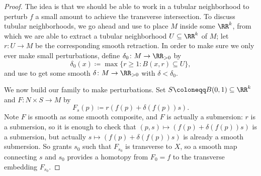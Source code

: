 \documentclass[../notes.tex]{subfiles}
\begin{document}
\begin{proof}
	The idea is that we should be able to work in a tubular neighborhood to perturb $f$ a small amount to achieve the transverse intersection. To discuss tubular neighborhoods, we go ahead and use  to place $M$ inside some $\RR^k$, from which we are able to extract a tubular neighborhood $U\subseteq\RR^k$ of $M$; let $r\colon U\to M$ be the corresponding smooth retraction. In order to make sure we only ever make small perturbations, define $\delta_0\colon M\to\RR_{>0}$ by
	\[\delta_0(x)\coloneqq\max\{r\ge1:B(x,r)\subseteq U\},\]
	and use  to get some smooth $\delta\colon M\to\RR_{>0}$ with $\delta<\delta_0$.

	We now build our family to make perturbations. Set $S\coloneqq B(0,1)\subseteq\RR^k$ and $F\colon N\times S\to M$ by
	\[F_s(p)\coloneqq r(f(p)+\delta(f(p))s).\]
	Note $F$ is smooth as some smooth composite, and $F$ is actually a submersion: $r$ is a submersion, so it is enough to check that $(p,s)\mapsto (f(p)+\delta(f(p))s )$ is a submersion, but actually $s\mapsto(f(p)+\delta(f(p))s)$ is already a smooth submersion. So  grants $s_0$ such that $F_{s_0}$ is transverse to $X$, so a smooth map connecting $s$ and $s_0$ provides a homotopy from $F_0=f$ to the transverse embedding $F_{s_0}$.
\end{proof}
\end{document}
